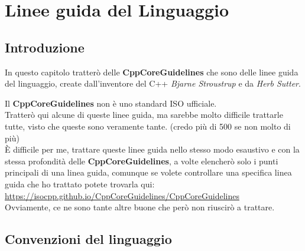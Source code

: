 
\chapter{Linee guida del Linguaggio} %


\section{Introduzione} %


\textsf{\small In questo capitolo tratterò delle \textbf{CppCoreGuidelines} che sono delle linee guida del linguaggio, create dall'inventore del C++ \emph{Bjarne Stroustrup} e da \emph{Herb Sutter}.} \break

\textsf{\small Il \textbf{CppCoreGuidelines} non è uno standard ISO ufficiale.} \\

\textsf{\small Tratterò qui alcune di queste linee guida, ma sarebbe molto difficile trattarle tutte, visto che queste sono veramente tante. (credo più di 500 se non molto di più)} \\

\textsf{\small È difficile per me, trattare queste linee guida nello stesso modo esaustivo e con la stessa profondità delle \textbf{CppCoreGuidelines}, a volte elencherò solo i punti principali di una linea guida, comunque se volete controllare una specifica linea guida che ho trattato potete trovarla qui: \href{CppCoreGuidelines}{https://isocpp.github.io/CppCoreGuidelines/CppCoreGuidelines}} \\
	
\textsf{\small Ovviamente, ce ne sono tante altre buone che però non riuscirò a trattare.} 

\break


\newpage

\section{Convenzioni del linguaggio}

